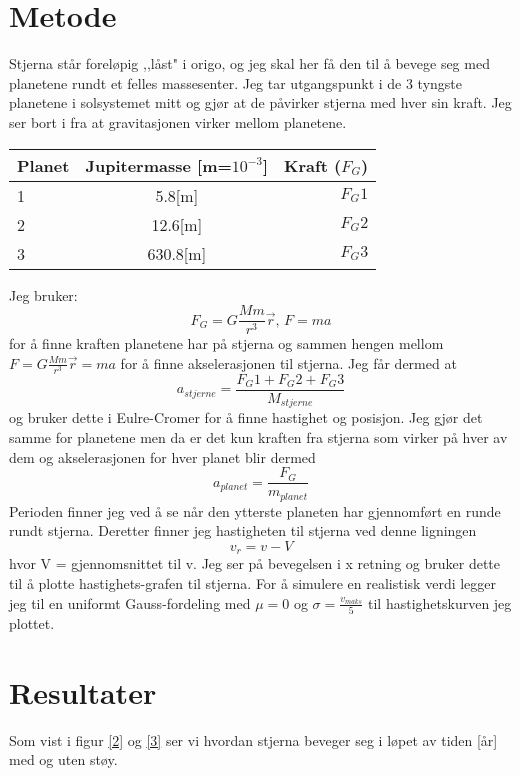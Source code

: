 \documentclass[12pt,preprint]{aastex6}
\begin{document}
\section{Metode}
Stjerna står foreløpig ,,låst" i origo, og jeg skal her få den til å bevege seg med planetene rundt et felles massesenter. Jeg tar utgangspunkt i de 3 tyngste planetene i solsystemet mitt og gjør at de påvirker stjerna med hver sin kraft. Jeg ser bort i fra at gravitasjonen virker mellom planetene. 
\begin{center}
  \begin{tabular}{ | l | c | r |}
    \hline
    Planet & Jupitermasse [m=$10^{-3}$] & Kraft ($F_G$)\\ \hline
    1 & 5.8[m] & $F_G1$\\ \hline
    2 & 12.6[m] & $F_G2$\\ \hline
    3 & 630.8[m]& $F_G3$\\
    \hline
  \end{tabular}
\end{center}
Jeg bruker:
$$F_G = G\frac{Mm}{r^3}\vec{r} \text{, } F = ma$$
for å finne kraften planetene har på stjerna og sammen hengen mellom $F =G\frac{Mm}{r^3}\vec{r} = ma $ for å finne akselerasjonen til stjerna. Jeg får dermed at $$a_{stjerne} = \frac{F_G1+F_G2+F_G3}{M_{stjerne}}$$
og bruker dette i Eulre-Cromer for å finne hastighet og posisjon. Jeg gjør det samme for planetene men da er det kun kraften fra stjerna som virker på hver av dem og akselerasjonen for hver planet blir dermed $$a_{planet} =  \frac{F_G}{m_{planet}}$$ 
Perioden finner jeg ved å se når den ytterste planeten har gjennomført en runde rundt stjerna.
Deretter finner jeg hastigheten til stjerna ved denne ligningen $$ v_r = v - V$$ hvor V = gjennomsnittet til v. Jeg ser på bevegelsen i x retning og bruker dette til å plotte hastighets-grafen til stjerna. For å simulere en realistisk verdi legger jeg til en uniformt Gauss-fordeling med $\mu = 0$ og $\sigma = \frac{v_{maks}}{5}$ til hastighetskurven jeg plottet. 



\section{Resultater}

Som vist i figur \ref{2} og \ref{3} ser vi hvordan stjerna beveger seg i løpet av tiden [år] med og uten støy.
\end{document}
